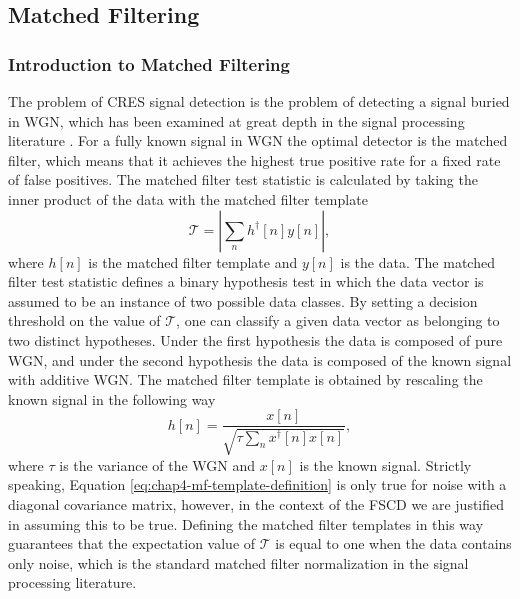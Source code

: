 \subsection{Matched Filtering}

\subsubsection*{Introduction to Matched Filtering}

The problem of CRES signal detection is the problem of detecting a signal buried in WGN, which has been examined at great depth in the signal processing literature \cite{detection_theory}. For a fully known signal in WGN the optimal detector is the matched filter, which means that it achieves the highest true positive rate for a fixed rate of false positives. The matched filter test statistic is calculated by taking the inner product of the data with the matched filter template
\begin{equation}
    \mathcal{T}=\left|\sum_{n}{h^\dagger[n]y[n]}\right|,
    \label{eq:chap4-mf-test-stat-perfect}
\end{equation}
where $h[n]$ is the matched filter template and $y[n]$ is the data. The matched filter test statistic defines a binary hypothesis test in which the data vector is assumed to be an instance of two possible data classes. By setting a decision threshold on the value of $\mathcal{T}$, one can classify a given data vector as belonging to two distinct hypotheses. Under the first hypothesis the data is composed of pure WGN, and under the second hypothesis the data is composed of the known signal with additive WGN. The matched filter template is obtained by rescaling the known signal in the following way
\begin{equation}
    h[n] = \frac{x[n]}{\sqrt{\tau \sum_{n}{x^\dagger[n]x[n]}}},
    \label{eq:chap4-mf-template-definition}
\end{equation}
where $\tau$ is the variance of the WGN and $x[n]$ is the known signal. Strictly speaking, Equation \ref{eq:chap4-mf-template-definition} is only true for noise with a diagonal covariance matrix, however, in the context of the FSCD we are justified in assuming this to be true. Defining the matched filter templates in this way guarantees that the expectation value of $\mathcal{T}$ is equal to one when the data contains only noise, which is the standard matched filter normalization in the signal processing literature.

